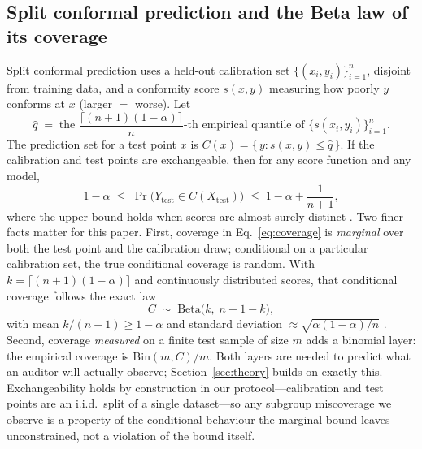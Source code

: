\documentclass[review,12pt]{elsarticle}
\begin{document}
\subsection{Split conformal prediction and the Beta law of its coverage}
\label{sec:splitcp}
Split conformal prediction \cite{papadopoulos2002,vovk2005,shafer2008} uses a held-out calibration set $\{(x_i, y_i)\}_{i=1}^{n}$, disjoint from training data, and a conformity score $s(x,y)$ measuring how poorly $y$ conforms at $x$ (larger $=$ worse). Let
\begin{equation}
\hat q \;=\; \text{the } \frac{\lceil (n+1)(1-\alpha) \rceil}{n}\text{-th empirical quantile of } \{s(x_i,y_i)\}_{i=1}^{n}.
\label{eq:quantile}
\end{equation}
The prediction set for a test point $x$ is $C(x) = \{\, y : s(x,y) \le \hat q \,\}$. If the calibration and test points are exchangeable, then for any score function and any model,
\begin{equation}
1-\alpha \;\le\; \Pr\big(Y_{\mathrm{test}} \in C(X_{\mathrm{test}})\big) \;\le\; 1-\alpha + \frac{1}{n+1},
\label{eq:coverage}
\end{equation}
where the upper bound holds when scores are almost surely distinct \cite{lei2018,angelopoulos2023}. Two finer facts matter for this paper. First, coverage in Eq.~\eqref{eq:coverage} is \emph{marginal} over both the test point and the calibration draw; conditional on a particular calibration set, the true conditional coverage is random. With $k = \lceil (n+1)(1-\alpha) \rceil$ and continuously distributed scores, that conditional coverage follows the exact law
\begin{equation}
C \;\sim\; \mathrm{Beta}\big(k,\; n+1-k\big),
\label{eq:beta}
\end{equation}
with mean $k/(n+1) \ge 1-\alpha$ and standard deviation $\approx \sqrt{\alpha(1-\alpha)/n}$ \cite{vovk2012,angelopoulos2023,bian2023}. Second, coverage \emph{measured} on a finite test sample of size $m$ adds a binomial layer: the empirical coverage is $\mathrm{Bin}(m, C)/m$. Both layers are needed to predict what an auditor will actually observe; Section~\ref{sec:theory} builds on exactly this. Exchangeability holds by construction in our protocol---calibration and test points are an i.i.d.\ split of a single dataset---so any subgroup miscoverage we observe is a property of the conditional behaviour the marginal bound leaves unconstrained, not a violation of the bound itself.
\end{document}
